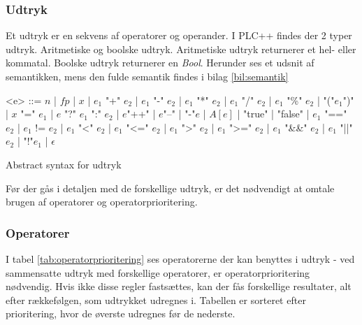 \subsubsection{Udtryk}
Et udtryk er en sekvens af operatorer og operander. I PLC++ findes der 2 typer udtryk. Aritmetiske og boolske udtryk. Aritmetiske udtryk returnerer et hel- eller kommatal. Boolske udtryk returnerer en \textit{Bool}. Herunder ses et udsnit af semantikken, mens den fulde semantik findes i bilag \ref{bil:semantik}

\begin{Grammar}
 \begin{grammar}

 <e> ::= $n$ | $fp$ | $x$  | $e_1$ "+" $e_2$ | $e_1$ "-" $e_2$ | $e_1$ "*" $e_2$ | $e_1$ "/" $e_2$ | $e_1$ "\%" $e_2$ | "("$e_1$")" | $x$ "=" $e_1$ | $e$ "?" $e_1$ ":" $e_2$ | $e$"++" | $e$"--" | "-"$e$ | $A[e]$ | "true" | "false" | $e_1$ "==" $e_2$ | $e_1$ != $e_2$ | $e_1$ "<" $e_2$ | $e_1$ "<=" $e_2$ | $e_1$ ">" $e_2$ | $e_1$ ">=" $e_2$ | $e_1$ "\&\&" $e_2$ | $e_1$ "||" $e_2$ | "!"$e_1$ | $\epsilon$

 \end{grammar}
 \caption{Abstract syntax for udtryk}\label{gra:expressions}
\end{Grammar}

\noindent Før der gås i detaljen med de forskellige udtryk, er det nødvendigt at omtale brugen af operatorer og operatorprioritering.

\subsubsection{Operatorer}
I tabel \ref{tab:operatorprioritering} ses operatorerne der kan benyttes i udtryk - ved sammensatte udtryk med forskellige operatorer, er operatorprioritering nødvendig. Hvis ikke disse regler fastsættes, kan der fås forskellige resultater, alt efter rækkefølgen, som udtrykket udregnes i. Tabellen er sorteret efter prioritering, hvor de øverste udregnes før de nederste.

